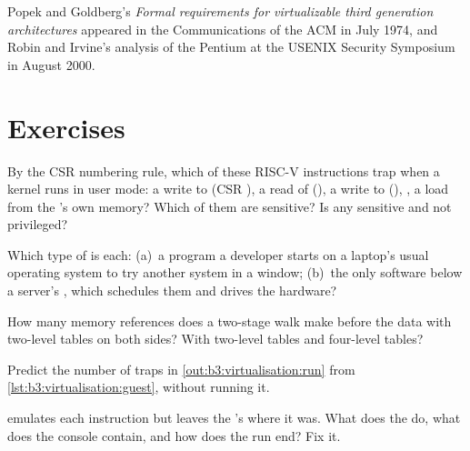 \begin{history}[Virtualisation]
Popek and Goldberg's \emph{Formal requirements for virtualizable third generation architectures} appeared in the Communications of the ACM in July 1974, %
and Robin and Irvine's analysis of the Pentium at the USENIX Security Symposium in August 2000. %
\end{history}

\section{Exercises}\label{sec:b3:virtualisation:exercises}

\begin{exercise}[$\star$]\label{exo:b3:virtualisation:1}
By the CSR numbering rule, which of these RISC-V instructions trap when a  kernel runs in user mode: a write to  (CSR ), a read of  (), a write to  (), , a load from the 's own memory? Which of them are sensitive? Is any sensitive and not privileged?
\end{exercise}

\begin{exercise}[$\star$]\label{exo:b3:virtualisation:2}
Which type of  is each: (a)~a program a developer starts on a laptop's usual operating system to try another system in a window; (b)~the only software below a server's , which schedules them and drives the hardware?
\end{exercise}

\begin{exercise}[$\star$]\label{exo:b3:virtualisation:3}
How many memory references does a two-stage walk make before the data with two-level tables on both sides? With two-level  tables and four-level  tables?
\end{exercise}

\begin{exercise}[$\star$]\label{exo:b3:virtualisation:4}
Predict the number of traps in \cref{out:b3:virtualisation:run} from \cref{lst:b3:virtualisation:guest}, without running it.
\end{exercise}

\begin{exercise}[$\star\star$]\label{exo:b3:virtualisation:5}
 emulates each instruction but leaves the 's  where it was. What does the  do, what does the console contain, and how does the run end? Fix it.
\end{exercise}

